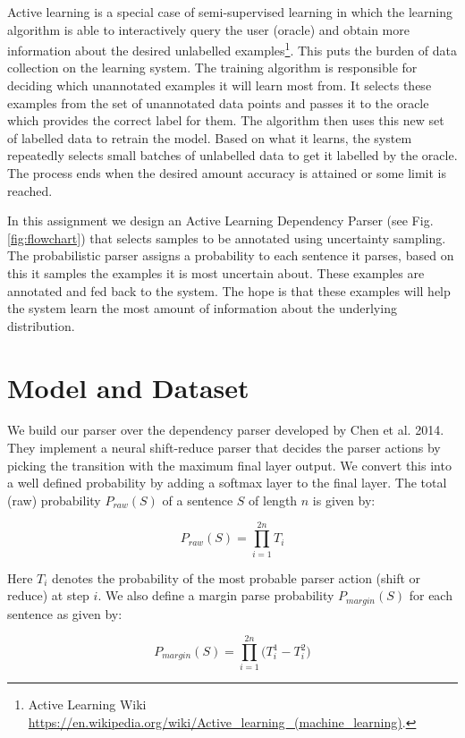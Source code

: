 \documentclass[11pt,letterpaper]{article}
\begin{document}
Active learning is a special case of semi-supervised learning in which the learning algorithm is able to interactively query the user (oracle) and obtain more information about the desired unlabelled examples\footnote{Active Learning Wiki \url{https://en.wikipedia.org/wiki/Active_learning_(machine_learning)}.}. This puts the burden of data collection on the learning system. The training algorithm is responsible for deciding which unannotated examples it will learn most from. It selects these examples from the set of unannotated data points and passes it to the oracle which provides the correct label for them. The algorithm then uses this new set of labelled data to retrain the model. Based on what it learns, the system repeatedly selects small batches of unlabelled data to get it labelled by the oracle. The process ends when the desired amount accuracy is attained or some limit is reached.

In this assignment we design an Active Learning Dependency Parser (see Fig. \ref{fig:flowchart}) that selects samples to be annotated using uncertainty sampling. The probabilistic parser assigns a probability to each sentence it parses, based on this it samples the examples it is most uncertain about. These examples are annotated and fed back to the system. The hope is that these examples will help the system learn the most amount of information about the underlying distribution.

\section{Model and Dataset}

We build our parser over the dependency parser developed by Chen et al. 2014. They implement a neural shift-reduce parser that decides the parser actions by picking the transition with the maximum final layer output. We convert this into a well defined probability by adding a softmax layer to the final layer. The total (raw) probability $P_{raw}(S)$ of a sentence $S$ of length $n$ is given by:

\begin{equation}
P_{raw}(S) = \prod_{i = 1}^{2n} {T}_i
\end{equation}

Here $T_i$ denotes the probability of the most probable parser action (shift or reduce) at step $i$. We also define a margin parse probability $P_{margin}(S)$ for each sentence as given by:

\begin{equation}
P_{margin}(S) = \prod_{i = 1}^{2n} \big(T_i^1 - T_i^2\big)
\end{equation}
\end{document}
